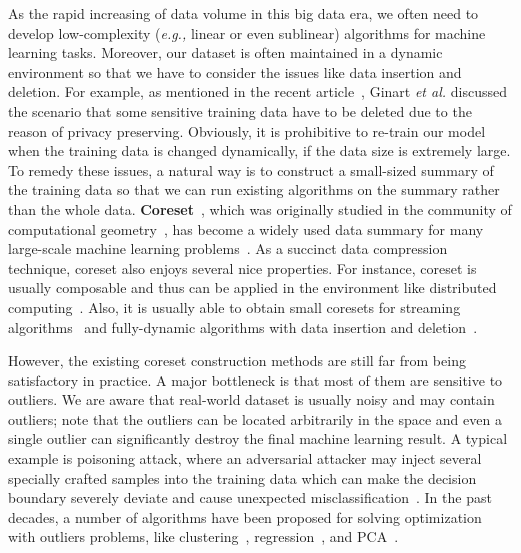 \documentclass{article}
\begin{document}
As the rapid increasing of data volume in this big data era, we often need to develop low-complexity ({\em e.g.,} linear or even sublinear) algorithms for machine learning tasks.  
Moreover, our dataset is often maintained in a dynamic environment so that we have to consider the  issues like  data insertion and deletion. For example, as mentioned in the recent article~\cite{GinartGVZ19}, Ginart {\em et al.} discussed the scenario that some sensitive training data  have to be deleted due to the reason of privacy preserving. Obviously, it is prohibitive to re-train our model when the training data is changed dynamically, if the data size is extremely large. To remedy these issues, a natural way is to construct a small-sized summary of the training data so that we can run existing algorithms on the summary rather than the whole data. \textbf{Coreset}~\cite{core-survey}, which was originally studied in the community of computational geometry~\cite{AgarwalHV04}, has become a widely used data summary for many large-scale machine learning problems~\cite{BravermanFL16,HugginsCB16,LucicFKF17,MunteanuSSW18,MirzasoleimanCL20,DBLP:conf/icml/HuangHLFD21}. 
As a succinct data compression technique, coreset also enjoys several nice properties. For instance, coreset is usually composable and thus can be applied in the environment like distributed computing~\cite{DBLP:conf/pods/IndykMMM14}. Also, it is  usually able to obtain small coresets  for streaming algorithms~\cite{Har-PeledM04,Chen09} and fully-dynamic algorithms  with data insertion and deletion~\cite{DBLP:journals/dcg/Chan09,HenzingerK20}. 


However, the existing coreset construction methods are still far from being satisfactory in practice. A major bottleneck is that most of them are sensitive to outliers. We are aware that 
real-world dataset is usually noisy and may contain outliers; note that the outliers can be located arbitrarily in the space and even a single outlier can significantly destroy the final machine learning result.  A typical example is poisoning attack, where an adversarial attacker may inject several specially crafted samples into the training data which can make the decision boundary severely deviate and cause unexpected misclassification~\cite{BiggioR18}. In the past decades, a number of algorithms have been proposed for solving optimization with outliers problems, like clustering~\cite{CharikarKMN01,Chen08,Chawla2013kmeansAU,GuptaLSM2017,k-Means+++}, regression~\cite{books/wi/RousseeuwL87,MountNPSW14,DBLP:conf/icml/DingW20}, and PCA~\cite{DBLP:journals/jacm/CandesLMW11}. 
\end{document}
